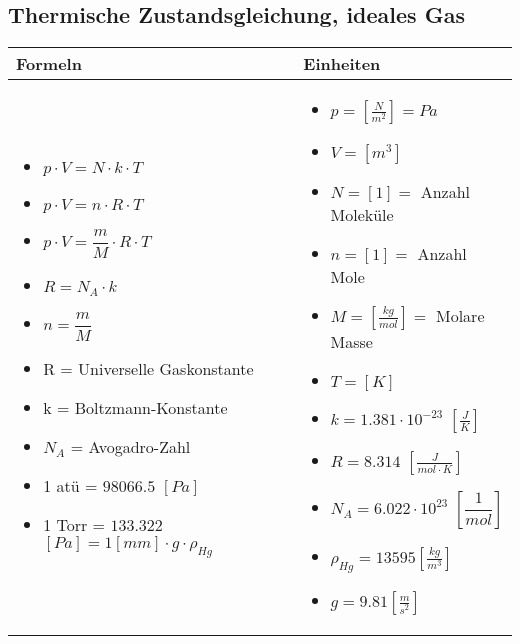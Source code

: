\newpage

\subsection{Thermische Zustandsgleichung, ideales Gas}				%
	\begin{tabular}{ | m{9cm} | m{9cm}  | }
		\hline
		Formeln & Einheiten \\ \hline
		\hline
		\begin{itemize}
			\item $p\cdot V=N\cdot k\cdot T$	
			\item $p\cdot V=n\cdot R\cdot T$
			\item $p\cdot V=\dfrac{m}{M}\cdot R\cdot T$
			\item $R=N_{A}\cdot k$ 
			\item $n=\dfrac{m}{M}$
			\item R = Universelle Gaskonstante
			\item k = Boltzmann-Konstante
			\item $N_{A}$ = Avogadro-Zahl
			\item {\color{red}1 atü = $98066.5$ $ [Pa]$}
			\item {\color{red}1 Torr = $133.322$ $ [Pa] = 1[mm]\cdot g\cdot \rho_{Hg}$}
		\end{itemize}
		&
		\begin{itemize}
			\item $p= [\frac{N}{m^{2}}]=Pa$
			\item $V=[m^3]$
			\item $N=[1]=$ Anzahl Moleküle
			\item $n=[1]=$ Anzahl Mole
			\item $M=[\frac{kg}{mol}]=$ Molare Masse
			\item $T=[K]$
			\item $k=1.381\cdot 10^{-23}$ $[\frac{J}{K}]$
			\item $R=8.314$ $[ \frac{J}{mol\cdot K} ]$
			\item $N_{A}=6.022\cdot 10^{23}$ $[\dfrac{1}{mol}] $
			\item $\rho_{Hg}=13595[\frac{kg}{m^3}]$
			\item $g=9.81[\frac{m}{s^2}]$
			
			
			
		\end{itemize}
		\\ \hline
	\end{tabular}

